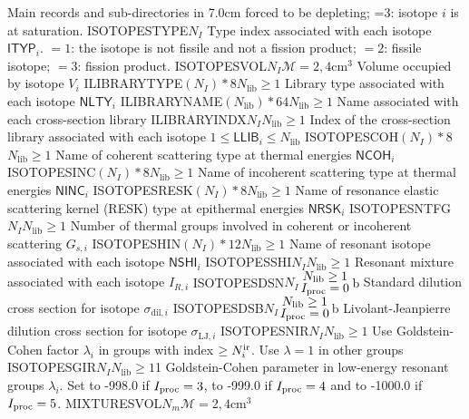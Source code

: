 \begin{DescriptionEnregistrement}{Main records and sub-directories in }{7.0cm}
{  forced to be depleting; =3: isotope $i$ is at saturation.}
\IntEnr
  {ISOTOPESTYPE}{$N_{I}$}
  {Type index associated with each isotope $\mathsf{ITYP}_{i}$. $=1$: the isotope is
  not fissile and not a fission product; $=2$: fissile isotope; $=3$: fission
  product.}
\OptRealEnr
  {ISOTOPESVOL}{$N_{I}$}{$\mathcal{M}=2, 4$}{cm$^{3}$}
  {Volume occupied by isotope $V_{i}$}
\OptCharEnr
  {ILIBRARYTYPE}{$(N_{I})*8$}{$N_{\mathrm{lib}}\ge 1$}
  {Library type associated with each isotope $\mathsf{NLTY}_{i}$}
\OptCharEnr
  {ILIBRARYNAME}{$(N_{\mathrm{lib}})*64$}{$N_{\mathrm{lib}}\ge 1$}
  {Name associated with each cross-section library}
\OptIntEnr
  {ILIBRARYINDX}{$N_{I}$}{$N_{\mathrm{lib}}\ge 1$}
  {Index of the cross-section library associated with each isotope $1 \le \mathsf{LLIB}_{i}\le N_{\mathrm{lib}}$}
\OptCharEnr
  {ISOTOPESCOH}{$(N_{I})*8$}{$N_{\mathrm{lib}}\ge 1$}
  {Name of coherent scattering type at thermal energies $\mathsf{NCOH}_{i}$}
\OptCharEnr
  {ISOTOPESINC}{$(N_{I})*8$}{$N_{\mathrm{lib}}\ge 1$}
  {Name of incoherent scattering type at thermal energies $\mathsf{NINC}_{i}$}
\OptCharEnr
  {ISOTOPESRESK}{$(N_{I})*8$}{$N_{\mathrm{lib}}\ge 1$}
  {Name of resonance elastic scattering kernel (RESK) type at epithermal energies $\mathsf{NRSK}_{i}$}
\OptIntEnr
  {ISOTOPESNTFG}{$N_{I}$}{$N_{\mathrm{lib}}\ge 1$}
  {Number of thermal groups involved in coherent or incoherent scattering $G_{s,i}$}
\OptCharEnr
  {ISOTOPESHIN}{$(N_{I})*12$}{$N_{\mathrm{lib}}\ge 1$}
  {Name of resonant isotope associated with each isotope $\mathsf{NSHI}_{i}$}
\OptIntEnr
  {ISOTOPESSHI}{$N_{I}$}{$N_{\mathrm{lib}}\ge 1$}
  {Resonant mixture associated with each isotope $I_{R,i}$}
\OptRealEnr
  {ISOTOPESDSN}{$N_{I}$}{${\displaystyle N_{\mathrm{lib}}\ge 1 \atop
  \displaystyle I_{\rm proc}=0}$}{b}
  {Standard dilution cross section for isotope $\sigma_{\mathrm{dil},i}$}
\OptRealEnr
  {ISOTOPESDSB}{$N_{I}$}{${\displaystyle N_{\mathrm{lib}}\ge 1 \atop
  \displaystyle I_{\rm proc}=0}$}{b}
  {Livolant-Jeanpierre dilution cross section for isotope $\sigma_{\mathrm{LJ},i}$}
\OptIntEnr
  {ISOTOPESNIR}{$N_{I}$}{$N_{\mathrm{lib}}\ge 1$}
  {Use Goldstein-Cohen factor $\lambda_i$ in groups with index $\ge N^{\rm ir}_i$.
  Use $\lambda=1$ in other groups}
\OptRealEnr
  {ISOTOPESGIR}{$N_{I}$}{$N_{\mathrm{lib}}\ge 1$}{1}
  {Goldstein-Cohen parameter in low-energy resonant groups $\lambda_i$. Set to -998.0 if
  $I_{\rm proc}=3$, to -999.0 if $I_{\rm proc}=4$ and to -1000.0 if $I_{\rm proc}=5$.}
\OptRealEnr
  {MIXTURESVOL}{$N_{m}$}{$\mathcal{M}=2, 4$}{cm$^{3}$}

\end{DescriptionEnregistrement}
